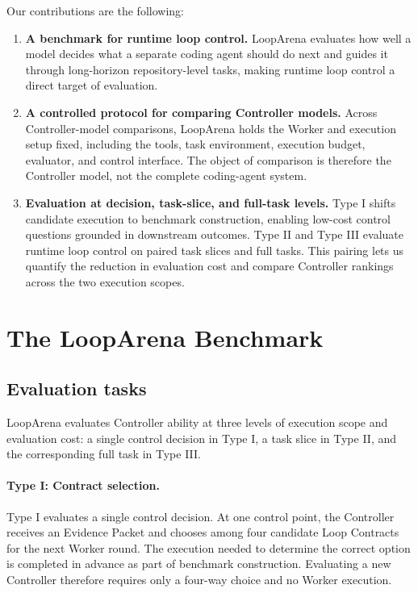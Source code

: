 Our contributions are the following:
\begin{enumerate}

\item \textbf{A benchmark for runtime loop control.}
LoopArena evaluates how well a model decides what a separate coding agent should do next and guides it through long-horizon repository-level tasks, making runtime loop control a direct target of evaluation.

\item \textbf{A controlled protocol for comparing Controller models.}
Across Controller-model comparisons, LoopArena holds the Worker and execution setup fixed, including the tools, task environment, execution budget, evaluator, and control interface. The object of comparison is therefore the Controller model, not the complete coding-agent system.

\item \textbf{Evaluation at decision, task-slice, and full-task levels.}
Type I shifts candidate execution to benchmark construction, enabling low-cost control questions grounded in downstream outcomes. Type II and Type III evaluate runtime loop control on paired task slices and full tasks. This pairing lets us quantify the reduction in evaluation cost and compare Controller rankings across the two execution scopes.

\end{enumerate}

\section{The LoopArena Benchmark}
\label{sec:benchmark}

\subsection{Evaluation tasks}
\label{sec:evaluation-tasks}

LoopArena evaluates Controller ability at three levels of execution scope and evaluation cost: a single control decision in Type I, a task slice in Type II, and the corresponding full task in Type III.

\paragraph{Type I: Contract selection.} Type I evaluates a single control decision. At one control point, the Controller receives an Evidence Packet and chooses among four candidate Loop Contracts for the next Worker round. The execution needed to determine the correct option is completed in advance as part of benchmark construction. Evaluating a new Controller therefore requires only a four-way choice and no Worker execution.

